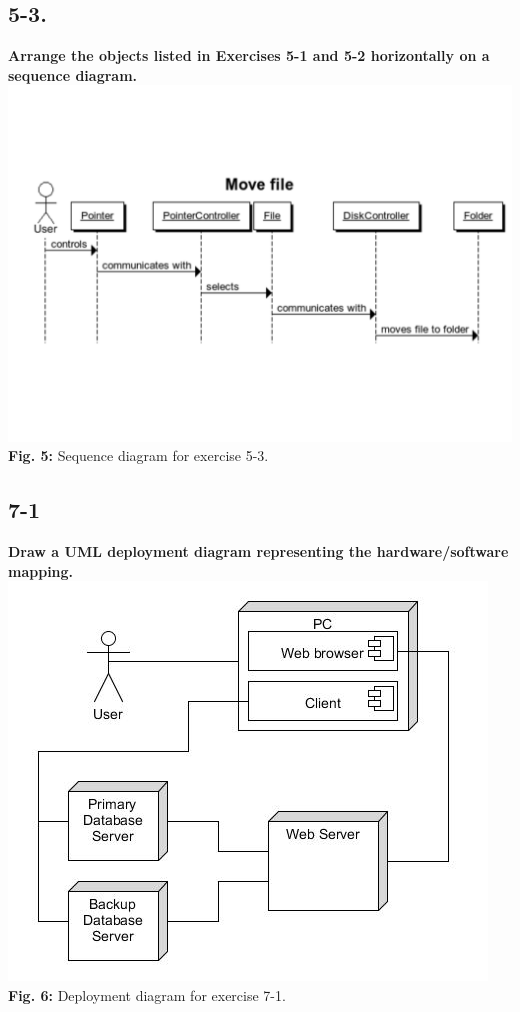\documentclass[12pt]{article}
\begin{document}
\subsection{5-3.}
\textbf{Arrange the objects listed in Exercises 5-1 and 5-2 horizontally on a sequence diagram.}\\
\includegraphics[scale=0.5]{5-3}\\
\textbf{Fig. 5:} Sequence diagram for exercise 5-3.



\newpage
\subsection{7-1}
\textbf{Draw a UML deployment diagram representing the hardware/software mapping.}\\

\includegraphics[scale=0.7]{7-1}\\
\textbf{Fig. 6:} Deployment diagram for exercise 7-1.
\end{document}
